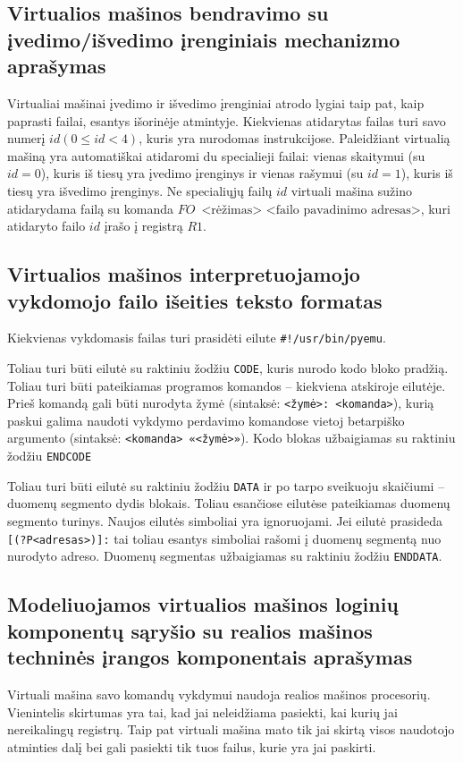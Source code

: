 \subsection{Virtualios mašinos bendravimo su įvedimo/išvedimo įrenginiais
mechanizmo aprašymas}

Virtualiai mašinai įvedimo ir išvedimo įrenginiai atrodo lygiai taip pat,
kaip paprasti failai, esantys išorinėje atmintyje. Kiekvienas atidarytas
failas turi savo numerį $id (0 \leq id < 4)$, kuris yra nurodomas 
instrukcijose. Paleidžiant virtualią mašiną yra automatiškai atidaromi
du specialieji failai: vienas skaitymui (su $id = 0$), kuris iš tiesų yra
įvedimo įrenginys ir vienas rašymui (su $id = 1$), kuris iš tiesų yra 
išvedimo įrenginys. Ne specialiųjų failų $id$ virtuali mašina sužino
atidarydama failą su komanda 
$FO\,\text{ <rėžimas> <failo pavadinimo adresas>}$,
kuri atidaryto failo $id$ įrašo į registrą $R1$.


\subsection{Virtualios mašinos interpretuojamojo vykdomojo failo išeities 
teksto formatas}

Kiekvienas vykdomasis failas turi prasidėti eilute
\verb|#!/usr/bin/pyemu|.

Toliau turi būti eilutė su raktiniu žodžiu \verb|CODE|, kuris nurodo
kodo bloko pradžią. Toliau turi būti pateikiamas programos komandos – 
kiekviena atskiroje eilutėje. Prieš komandą gali būti nurodyta žymė
(sintaksė: \verb|<žymė>: <komanda>|), kurią paskui galima naudoti vykdymo
perdavimo komandose vietoj betarpiško argumento (sintaksė: 
\verb|<komanda> «<žymė>»|). Kodo blokas užbaigiamas su raktiniu žodžiu
\verb|ENDCODE|

Toliau turi būti eilutė su raktiniu žodžiu \verb|DATA| ir po tarpo 
sveikuoju skaičiumi – duomenų segmento dydis blokais.
Toliau esančiose eilutėse pateikiamas duomenų segmento turinys. Naujos
eilutės simboliai yra ignoruojami. Jei eilutė prasideda 
\verb|[(?P<adresas>)]:| tai toliau esantys simboliai rašomi į duomenų
segmentą nuo nurodyto adreso. Duomenų segmentas užbaigiamas su 
raktiniu žodžiu \verb|ENDDATA|.

\subsection{Modeliuojamos virtualios mašinos loginių komponentų sąryšio su 
realios mašinos techninės įrangos komponentais aprašymas}

Virtuali mašina savo komandų vykdymui naudoja realios mašinos procesorių.
Vienintelis skirtumas yra tai, kad jai neleidžiama pasiekti, kai kurių
jai nereikalingų registrų. Taip pat virtuali mašina mato tik jai skirtą
visos naudotojo atminties dalį bei gali pasiekti tik tuos failus, kurie
yra jai paskirti.
   

